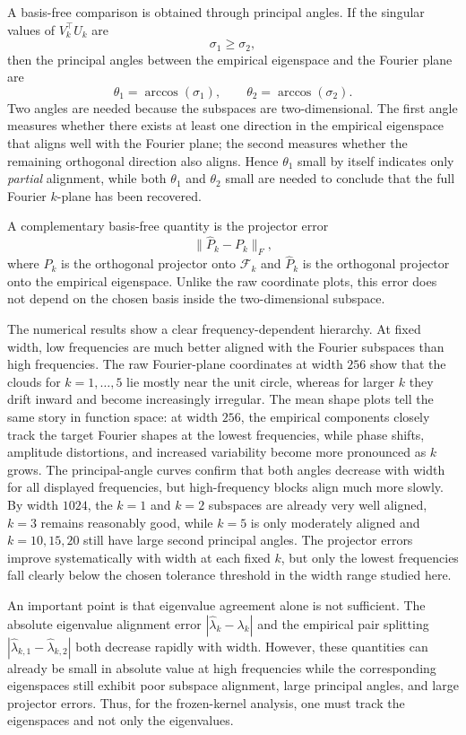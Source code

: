 \documentclass[11pt]{article}
\begin{document}
A basis-free comparison is obtained through principal angles. If the singular values of \(V_k^\top U_k\) are
\[
	\sigma_1\ge \sigma_2,
\]
then the principal angles between the empirical eigenspace and the Fourier plane are
\[
	\theta_1=\arccos(\sigma_1),\qquad \theta_2=\arccos(\sigma_2).
\]
Two angles are needed because the subspaces are two-dimensional. The first angle measures whether there exists at least one direction in the empirical eigenspace that aligns well with the Fourier plane; the second measures whether the remaining orthogonal direction also aligns. Hence \(\theta_1\) small by itself indicates only \emph{partial} alignment, while both \(\theta_1\) and \(\theta_2\) small are needed to conclude that the full Fourier \(k\)-plane has been recovered.

A complementary basis-free quantity is the projector error
\[
	\|\widehat P_k-P_k\|_F,
\]
where \(P_k\) is the orthogonal projector onto \(\mathcal F_k\) and \(\widehat P_k\) is the orthogonal projector onto the empirical eigenspace. Unlike the raw coordinate plots, this error does not depend on the chosen basis inside the two-dimensional subspace.

The numerical results show a clear frequency-dependent hierarchy. At fixed width, low frequencies are much better aligned with the Fourier subspaces than high frequencies. The raw Fourier-plane coordinates at width \(256\) show that the clouds for \(k=1,\dots,5\) lie mostly near the unit circle, whereas for larger \(k\) they drift inward and become increasingly irregular. The mean shape plots tell the same story in function space: at width \(256\), the empirical components closely track the target Fourier shapes at the lowest frequencies, while phase shifts, amplitude distortions, and increased variability become more pronounced as \(k\) grows. The principal-angle curves confirm that both angles decrease with width for all displayed frequencies, but high-frequency blocks align much more slowly. By width \(1024\), the \(k=1\) and \(k=2\) subspaces are already very well aligned, \(k=3\) remains reasonably good, while \(k=5\) is only moderately aligned and \(k=10,15,20\) still have large second principal angles. The projector errors improve systematically with width at each fixed \(k\), but only the lowest frequencies fall clearly below the chosen tolerance threshold in the width range studied here.

An important point is that eigenvalue agreement alone is not sufficient. The absolute eigenvalue alignment error \(|\widehat\lambda_k-\lambda_k|\) and the empirical pair splitting \(|\widehat\lambda_{k,1}-\widehat\lambda_{k,2}|\) both decrease rapidly with width. However, these quantities can already be small in absolute value at high frequencies while the corresponding eigenspaces still exhibit poor subspace alignment, large principal angles, and large projector errors. Thus, for the frozen-kernel analysis, one must track the eigenspaces and not only the eigenvalues.
\end{document}
